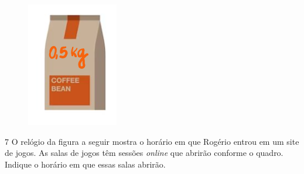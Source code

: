 \begin{figure}[htpb!]
\centering
\includegraphics[width=.65\textwidth]{./media/image54.png}
\end{figure}


\num{7} O relógio da figura a seguir mostra o horário em que Rogério entrou em um
site de jogos. As salas de jogos têm sessões \emph{online} que abrirão
conforme o quadro. Indique o horário em que essas salas abrirão.


